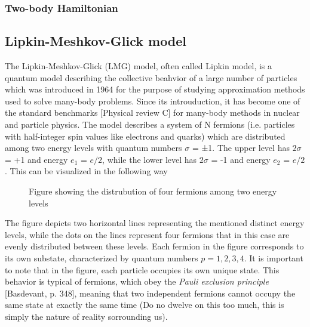 \documentclass[onecolumn,10pt,cleanfoot]{asme2ej}
\begin{document}
\subsubsection{Two-body Hamiltonian}



\subsection{Lipkin-Meshkov-Glick model}
The Lipkin-Meshkov-Glick (LMG) model, often called Lipkin model, is a quantum model describing the collective beahvior of a large number of particles which was introduced in 1964 for the purpose of studying approximation methods used to solve many-body problems. Since its introuduction, it has become one of the standard benchmarks [Physical review C] for many-body methods in nuclear and particle physics. The model describes a system of N fermions (i.e. particles with half-integer spin values like electrons and quarks) which are distributed among two energy levels with quantum numbers $\sigma$ = ±1. The upper level has $2\sigma$ = +1 and energy $e_{1}$ = $e/2$, while the lower level has $2\sigma$ = -1 and energy $e_{2}$ = $e/2$. This can be visualized in the following way

\begin{figure}[H]
	\centering
	\caption{Figure showing the distrubution of four fermions among two energy levels}
\end{figure}

The figure depicts two horizontal lines representing the mentioned distinct energy levels, while the dots on the lines represent four fermions that in this case are evenly distributed between these levels. Each fermion in the figure corresponds to its own substate, characterized by quantum numbers $p = 1, 2, 3, 4$. It is important to note that in the figure, each particle occupies its own unique state. This behavior is typical of fermions, which obey the \textit{Pauli exclusion principle} [Basdevant, p. 348], meaning that two independent fermions cannot occupy the same state at exactly the same time (Do no dwelve on this too much, this is simply the nature of reality sorrounding us).
\end{document}
